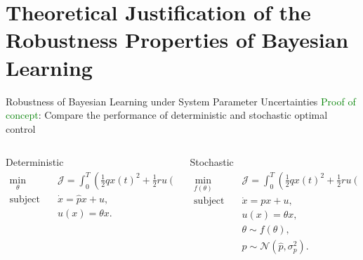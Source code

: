

\section{Theoretical Justification of the Robustness Properties of Bayesian Learning}
\centering
{}

\begin{frame}{Robustness of Bayesian Learning under System Parameter Uncertainties}
  \textcolor{green}{Proof of concept}:
  Compare the performance of deterministic and stochastic optimal control
  \begin{small}
      \begin{columns}
        \begin{column}[t]{0.48\linewidth}
          \begin{exampleblock}{Deterministic}
              \begin{equation*}
                  \begin{aligned}
                  \underset{\theta }{\text{min}} 
                  &\quad \mathcal{J} = \int_0^T \left(\frac{1}{2}qx(t)^2 + \frac{1}{2}ru(t)^2 \right) dt \\
                  \text{subject to} 
                  &\quad \dot{x} = \hat{p}x + u,\\
                  &\quad u(x) = \theta x. \\ 
                  \end{aligned}    
              \end{equation*}
  \end{exampleblock}
\end{column}
\begin{column}[t]{0.49\linewidth}
  \begin{alertblock}{Stochastic}
      \begin{equation*}
          \begin{aligned}
          \underset{f(\theta)}{\text{min}} 
          &\quad \mathcal{J} = \int_0^T \left(\frac{1}{2}qx(t)^2 + \frac{1}{2}ru(t)^2 \right) dt \\
          \text{subject to} 
          &\quad \dot{x} = px + u,\\
          &\quad u(x) = \theta x, \\ 
          &\quad \theta \sim f(\theta), \\ 
          &\quad p \sim \mathcal{N}(\hat{p}, \sigma_p^2).  
          \end{aligned}    
      \end{equation*}
  \end{alertblock}
\end{column}
\end{columns}
\end{small}

\end{frame}

